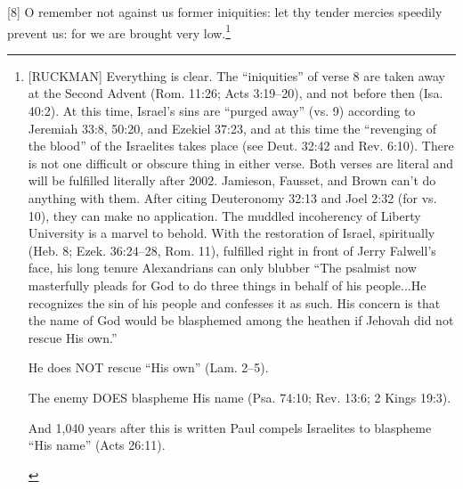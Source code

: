 [8] \textcolor[rgb]{0.00,0.00,1.00}{O remember not against us former iniquities: let thy tender mercies speedily prevent us: for we are brought very low.}\footnote{[RUCKMAN] Everything is clear. The “iniquities” of verse 8 are taken away at the Second Advent (Rom. 11:26; Acts 3:19--20), and not before then (Isa. 40:2). At this time, Israel’s sins are “purged away” (vs. 9) according to Jeremiah 33:8, 50:20, and Ezekiel 37:23, and at this time the “revenging of the blood” of the Israelites takes place (see Deut. 32:42 and Rev. 6:10). There is not one difficult or obscure thing in either verse. Both verses are literal and will be fulfilled literally after 2002. Jamieson, Fausset, and Brown can’t do anything with them. After citing Deuteronomy 32:13 and Joel 2:32 (for vs. 10), they can make no application. The muddled incoherency of Liberty University is a marvel to behold. With the restoration of Israel, spiritually (Heb. 8; Ezek. 36:24–28, Rom. 11), fulfilled right in front of Jerry Falwell’s face, his long tenure Alexandrians can only blubber “The psalmist now masterfully pleads for God to do three things in behalf of his people...He recognizes the sin of his people and confesses it as such. His concern is that the name of God would be blasphemed among the heathen if Jehovah did not rescue His own.”
\begin{compactenum}
\item He does NOT rescue “His own” (Lam. 2--5).
\item The enemy DOES blaspheme His name (Psa. 74:10; Rev. 13:6; 2 Kings 19:3).
\item And 1,040 years after this is written Paul compels Israelites to blaspheme “His name” (Acts 26:11).
\end{compactenum} 
}
